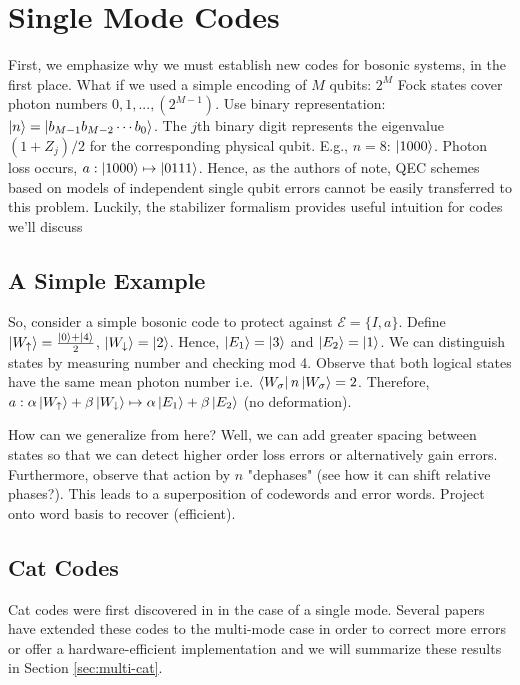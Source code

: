 \documentclass[12]{amsart}
\newcommand\0{\mathbf{0}}
\newcommand\<{\langle}
\renewcommand\>{\rangle}
\begin{document}
\section{Single Mode Codes}

First, we emphasize why we must establish new codes for bosonic systems, in the first place. What if we used a simple encoding of $M$ qubits: $2^M$ Fock states cover photon numbers $0, 1, . . . , (2^{M - 1})$. Use binary representation: $\ket{n} = \ket{b_{M-1} b_{M-2} \cdots b_0 }$. The $j$th binary digit represents the eigenvalue $(1 + Z_j)/2$ for the corresponding physical qubit. E.g., $n=8$: $\ket{1000}$. Photon loss occurs, $a : \ket{1000} \mapsto \ket{0111}$. Hence, as the authors of \cite{michael2016new} note, QEC schemes based on models of independent single qubit errors cannot be easily transferred to this problem. Luckily, the stabilizer formalism provides useful intuition for codes we'll discuss

\subsection{A Simple Example}

So, consider a simple bosonic code to protect against $\mathcal{E} = \{ I, a \}$. Define $\ket{W_\uparrow} = \frac{\ket{0} + \ket{4}}{2}$, $\ket{W_\downarrow} = \ket{2}$. Hence, $\ket{E_1} = \ket{3}$ and $\ket{E_2} = \ket{1}$. We can distinguish states by measuring number and checking mod 4. Observe that both logical states have the same mean photon number i.e. $\bra{W_\sigma} n \ket{W_\sigma} = 2$. Therefore, $a : \alpha\ket{W_\uparrow} + \beta\ket{W_\downarrow} \mapsto \alpha \ket{E_1} + \beta \ket{E_2}$ (no deformation).

How can we generalize from here? Well, we can add greater spacing between states so that we can detect higher order loss errors or alternatively gain errors. Furthermore, observe that action by $n$ "dephases" (see how it can shift relative phases?). This leads to a superposition of codewords and error words. Project onto word basis to recover (efficient).

\subsection{Cat Codes}

Cat codes were first discovered in \cite{cochrane1999macroscopically} in the case of a single mode. Several papers have extended these codes to the multi-mode case in order to correct more errors or offer a hardware-efficient implementation\cite{albert2018multimode, leghtas2013hardware, mirrahimi2014dynamically} and we will summarize these results in Section \ref{sec:multi-cat}.
\end{document}
